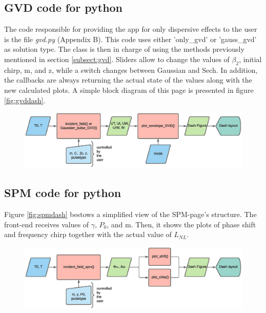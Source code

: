     \subsection{GVD code for python}
    The code responsible for providing the app for only dispersive effects to the user is the file \emph{gvd.py} (Appendix B). This code uses either 'only\_gvd' or 'gauss\_gvd' as solution type. The class is then in charge of using the methods previously mentioned in section \ref{subsect:gvd}. Sliders allow to change the values of $\beta_2$, initial chirp, m, and z, while a switch changes between Gaussian and Sech. In addition, the callbacks are always returning the actual state of the values along with the new calculated plots.  A simple block diagram of this page is presented in figure \ref{fig:gvddash}.
        
    \begin{figure}[label={fig:gvddash}, caption={Simplified Block-Diagram of gvd.py}]
        	\includegraphics[trim = 2.5cm 12.5cm 5cm 2.5cm, clip, clip,width=1\textwidth]{figures/chap3/GVD.eps} 
        \end{figure}
    \subsection{SPM code for python}
    Figure \ref{fig:spmdash} bestows a simplified view of the SPM-page's structure.  The front-end receives values of $\gamma$, $P_0$, and m. Then, it shows the plots of phase shift and frequency chirp together with the actual value of $L_{NL}$. 
        \begin{figure}[label={fig:spmdash}, caption={Simplified Block-Diagram of spm.py}]
        	\includegraphics[trim = 0.5cm 12.5cm 6.5cm 1.2cm, clip, clip,width=1\textwidth]{figures/chap3/SPM.eps} 
        \end{figure}
        
